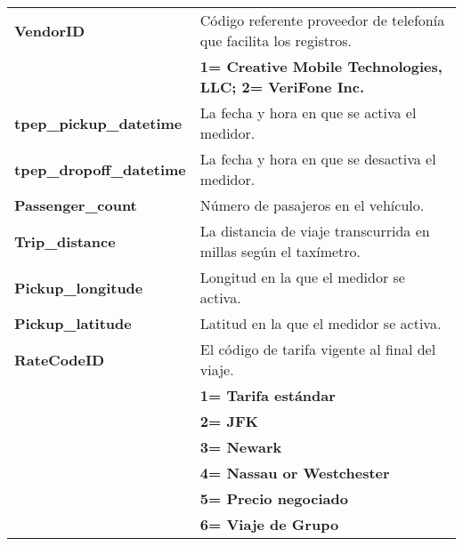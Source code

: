 \begin{table}[h!]
	\centering
	\begin{tabular}{|l||l|}
		
		\hline
		
		\textbf{VendorID} & Código referente proveedor de telefonía que facilita los registros.\\
		                  & \textbf{1= Creative Mobile Technologies, LLC; 2= VeriFone Inc.} \\
		
		\hline
		 
		\textbf{tpep\_pickup\_datetime} & La fecha y hora en que se activa el medidor. \\
		
		\hline
		 
		\textbf{tpep\_dropoff\_datetime} & La fecha y hora en que se desactiva el medidor. \\
		
		\hline
		 
		\textbf{Passenger\_count} & Número de pasajeros en el vehículo. \\ 
		
		\hline
		 
		\textbf{Trip\_distance} & La distancia de viaje transcurrida en millas según el taxímetro. \\
		
		\hline
		 
		\textbf{Pickup\_longitude} & Longitud en la que el medidor se activa. \\
		
		\hline
		 
		\textbf{Pickup\_latitude} & Latitud en la que el medidor se activa. \\
		
		\hline
		
		\textbf{RateCodeID} & El código de tarifa vigente al final del viaje. \\
		                    & \textbf{1= Tarifa estándar} \\
		                    & \textbf{2= JFK} \\
		                    & \textbf{3= Newark} \\
		                    & \textbf{4= Nassau or Westchester} \\
		                    & \textbf{5= Precio negociado} \\
		                    & \textbf{6= Viaje de Grupo} \\
		

\end{tabular}
\end{table}
